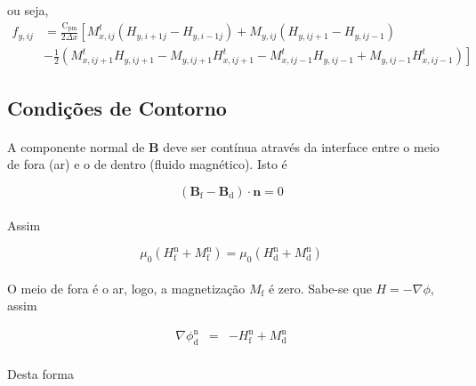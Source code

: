 \documentclass[eletromagnetismo.tex]{subfiles}
\begin{document}
ou seja,
\begin{align}
f_{y,ij} & = \frac{\mathrm{C}_{\mathrm{pm}}}{2\Delta x}\left[M_{x,ij}^t (H_{y,i+1j} - H_{y,i-1j})+M_{y,ij} (H_{y,ij+1} - H_{y,ij-1}) \right. \nonumber \\
&-\left. \tfrac{1}{2}(M_{x,ij+1}^t H_{y,ij+1} - M_{y,ij+1} H_{x,ij+1}^t - M_{x,ij-1}^t H_{y,ij-1} + M_{y,ij-1} H_{x,ij-1}^t) \right]
\end{align}



\subsection{Condições de Contorno}
\paragraph{} A componente normal de $\mathbf{B}$ deve ser contínua através da interface entre o meio de fora (ar) e o de dentro (fluido magnético). Isto é

\begin{equation}
\left(\mathbf{B}_{\mathrm{f}} - \mathbf{B}_{\mathrm{d}}\right)\cdot \mathbf{n} = 0
\end{equation}

\paragraph{} Assim

\begin{equation}
\mu_0 (H_{\mathrm{f}}^{\mathrm{n}} + M_{\mathrm{f}}^{\mathrm{n}}) =  \mu_0(H_{\mathrm{d}}^{\mathrm{n}}+M_{\mathrm{d}}^{\mathrm{n}})
\end{equation}

\paragraph{} O meio de fora é o ar, logo, a magnetização $M_{\mathrm{f}}$ é zero. Sabe-se que $H = -\nabla\phi$, assim

\begin{eqnarray}
\nabla\phi_{\mathrm{d}}^{\mathrm{n}} & = & -H_{\mathrm{f}}^{\mathrm{n}} + M_{\mathrm{d}}^{\mathrm{n}}
\end{eqnarray}

\paragraph{} Desta forma
\end{document}
